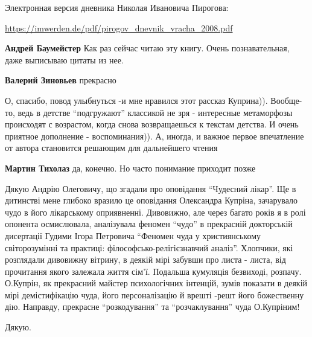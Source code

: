  
 
 
 
 
\zzSecCmt

\begin{itemize} %
Электронная версия дневника Николая Ивановича Пирогова: 

\url{https://imwerden.de/pdf/pirogov_dnevnik_vracha_2008.pdf}

\begin{itemize} %
\textbf{Андрей Баумейстер} Как раз сейчас читаю эту книгу. Очень познавательная, даже выписываю цитаты из нее.


\textbf{Валерий Зиновьев} прекрасно
\end{itemize} %


О, спасибо, повод улыбнуться -и мне нравился этот рассказ Куприна)). Вообще-то,
ведь в детстве \enquote{подгружают} классикой не зря - интересные метаморфозы
происходят с возрастом, когда снова возвращаешься к текстам детства. И очень
приятное дополнение - воспоминания)). А, иногда, и важное первое впечатление от
автора становится решающим для дальнейшего чтения

\begin{itemize} %
\textbf{Мартин Тихолаз} да, конечно. Но часто понимание приходит позже
\end{itemize} %


Дякую Андрію Олеговичу, що згадали про оповідання \enquote{Чудесний лікар}. Ще в
дитинстві мене глибоко вразило це оповідання Олександра Купріна, зачарувало
чудо в його лікарському оприявненні. Дивовижно, але через багато років я в ролі
опонента осмислювала, аналізувала феномен \enquote{чудо} в прекрасній докторській
дисертації Гудими Ігора Петровича \enquote{Феномен чуда у християнському світорозумінні
та практиці: філософсько-релігієзнавчий аналіз}. Хлопчики, які розглядали
дивовижну вітрину, в деякій мірі забувши про листа - листа, від прочитання
якого залежала життя сім'ї. Подальша кумуляція безвиході, розпачу. О.Купрін, як
прекрасний майстер психологічних інтенцій, зумів показати в деякій мірі
демістифікацію чуда, його персоналізацію й врешті -решт його божественну дію.
Направду, прекрасне \enquote{розкодування} та \enquote{розчаклування} чуда О.Купріним!

Дякую.

\end{itemize} %
